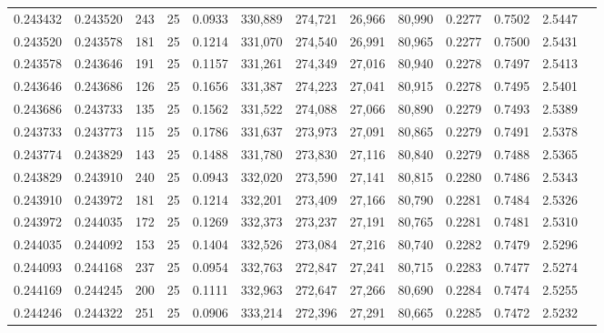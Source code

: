 \begin{tabular}{rrrrrrrrrrrrr}
0.243432 & 0.243520 &   243 &  25 &                                     0.0933 & 330,889 & 274,721 &  26,966 &  80,990 & 0.2277 & 0.7502 & 2.5447 \\
0.243520 & 0.243578 &   181 &  25 &                                     0.1214 & 331,070 & 274,540 &  26,991 &  80,965 & 0.2277 & 0.7500 & 2.5431 \\
0.243578 & 0.243646 &   191 &  25 &                                     0.1157 & 331,261 & 274,349 &  27,016 &  80,940 & 0.2278 & 0.7497 & 2.5413 \\
0.243646 & 0.243686 &   126 &  25 &                                     0.1656 & 331,387 & 274,223 &  27,041 &  80,915 & 0.2278 & 0.7495 & 2.5401 \\
0.243686 & 0.243733 &   135 &  25 &                                     0.1562 & 331,522 & 274,088 &  27,066 &  80,890 & 0.2279 & 0.7493 & 2.5389 \\
0.243733 & 0.243773 &   115 &  25 &                                     0.1786 & 331,637 & 273,973 &  27,091 &  80,865 & 0.2279 & 0.7491 & 2.5378 \\
0.243774 & 0.243829 &   143 &  25 &                                     0.1488 & 331,780 & 273,830 &  27,116 &  80,840 & 0.2279 & 0.7488 & 2.5365 \\
0.243829 & 0.243910 &   240 &  25 &                                     0.0943 & 332,020 & 273,590 &  27,141 &  80,815 & 0.2280 & 0.7486 & 2.5343 \\
0.243910 & 0.243972 &   181 &  25 &                                     0.1214 & 332,201 & 273,409 &  27,166 &  80,790 & 0.2281 & 0.7484 & 2.5326 \\
0.243972 & 0.244035 &   172 &  25 &                                     0.1269 & 332,373 & 273,237 &  27,191 &  80,765 & 0.2281 & 0.7481 & 2.5310 \\
0.244035 & 0.244092 &   153 &  25 &                                     0.1404 & 332,526 & 273,084 &  27,216 &  80,740 & 0.2282 & 0.7479 & 2.5296 \\
0.244093 & 0.244168 &   237 &  25 &                                     0.0954 & 332,763 & 272,847 &  27,241 &  80,715 & 0.2283 & 0.7477 & 2.5274 \\
0.244169 & 0.244245 &   200 &  25 &                                     0.1111 & 332,963 & 272,647 &  27,266 &  80,690 & 0.2284 & 0.7474 & 2.5255 \\
0.244246 & 0.244322 &   251 &  25 &                                     0.0906 & 333,214 & 272,396 &  27,291 &  80,665 & 0.2285 & 0.7472 & 2.5232 \\

\end{tabular}
